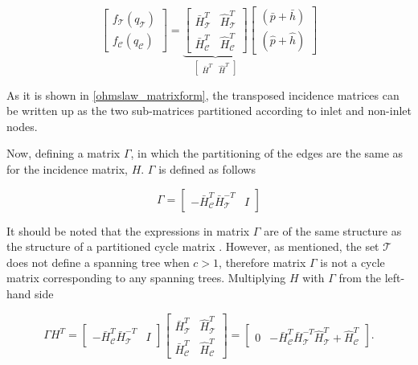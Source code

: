 \begin{equation}
\label{ohmslaw_matrixform}
 \begin{bmatrix} 
 f_{\mathcal{T}}(q_\mathcal{T}) \\[3pt]
 f_{\mathcal{C}}(q_\mathcal{C}) 
 \end{bmatrix}
 =
  \underbrace{\begin{bmatrix}
   \bar{H}^T_{\mathcal{T}} & \hat{H}^T_{\mathcal{T}} \\[3pt]
   \bar{H}^T_{\mathcal{C}} & \hat{H}^T_{\mathcal{C}} 
   \end{bmatrix}}_{\begin{bmatrix} 
                  \bar{H}^T & \hat{H}^T 
                  \end{bmatrix}}
   \begin{bmatrix} 
 (\bar{p} + \bar{h}) \\[3pt] 
 (\hat{p} + \hat{h}) 
 \end{bmatrix}
\end{equation}

As it is shown in \eqref{ohmslaw_matrixform}, the transposed incidence matrices can be written up as the two sub-matrices partitioned according to inlet and non-inlet nodes. 

Now, defining a matrix $\Gamma$, in which the partitioning of the edges are the same as for the incidence matrix, $H$. $\Gamma$ is defined as follows

\begin{equation}
\label{bmatrix}
\Gamma
 =
\begin{bmatrix} 
-\bar{H}^T_{\mathcal{C}}\bar{H}^{-T}_{\mathcal{T}} & I 
\end{bmatrix}
\end{equation}

It should be noted that the expressions in matrix $\Gamma$ are of the same structure as the structure of a partitioned cycle matrix \cite{deo2017graph}. However, as mentioned, the set $\mathcal{T}$ does not define a spanning tree when $c>1$, therefore matrix $\Gamma$ is not a cycle matrix corresponding to any spanning trees. Multiplying $H$ with $\Gamma$ from the left-hand side

 \begin{equation}
  \label{meshlaw_analogy}
  \Gamma H^T = 
  \begin{bmatrix} 
-\bar{H}^T_{\mathcal{C}}\bar{H}^{-T}_{\mathcal{T}} & I 
\end{bmatrix}
\begin{bmatrix}
   \bar{H}^T_{\mathcal{T}} & \hat{H}^T_{\mathcal{T}} \\[3pt]
   \bar{H}^T_{\mathcal{C}} & \hat{H}^T_{\mathcal{C}} 
   \end{bmatrix} 
   =
   \begin{bmatrix} 
0 & -\bar{H}^T_{\mathcal{C}}\bar{H}^{-T}_{\mathcal{T}}\hat{H}^T_{\mathcal{T}} + \hat{H}^T_{\mathcal{C}} 
\end{bmatrix}
.
\end{equation}

